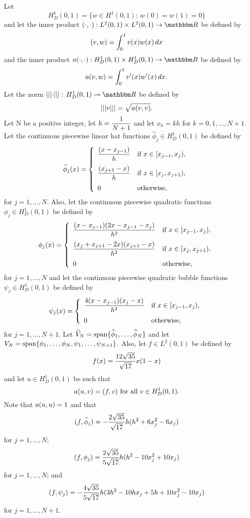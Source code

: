 Let
\[
H^1_D(0,1)=\{w\in H^1(0,1):\,w(0)=w(1)=0\}
\]
and let the inner product $\ip{\cdot,\cdot}:L^2(0,1)\times L^2(0,1)\to\R$ be defined by
\[
(v,w)=\int_0^1v(x)w(x)\,dx
\]
and the inner product $a\ip{\cdot,\cdot}:H^1_D(0,1)\times H^1_D(0,1)\to\R$ be defined by
\[
a(v,w)=\int_0^1v'(x)w'(x)\,dx.
\]
Let the norm $\left|\left|\left|\cdot\right|\right|\right|:\,H^1_D(0,1)\to\R$ be defined by
\[
\left|\left|\left|v\right|\right|\right|=\sqrt{a(v,v)}.
\]
Let N be a positive integer, let $\displaystyle{h={1 \over N+1}}$ and let $x_k=kh$ for $k=0,1,\ldots,N+1$. Let the continuous piecewise linear hat functions $\widehat{\phi}_j\in H^1_D(0,1)$ be defined by
\[
\widehat{\phi}_j(x) = \left\{\begin{array}{ll}
\displaystyle{{(x-x_{j-1}) \over h}} & \displaystyle{\mbox{if }x\in[x_{j-1},x_j)},
\\[10pt]
\displaystyle{{(x_{j+1}-x) \over h}} & \displaystyle{\mbox{if }x\in[x_j,x_{j+1})},
\\[10pt]
0 & \mbox{otherwise},
\end{array}\right.
\]
for $j=1,\ldots,N$. Also, let the continuous piecewise quadratic functions $\phi_j\in H^1_D(0,1)$ be defined by
\[
\phi_j(x)=\left\{\begin{array}{ll}
\displaystyle{{(x-x_{j-1})(2x-x_{j-1}-x_j) \over h^2}} & \displaystyle{\mbox{if }x\in[x_{j-1},x_j)},
\\[10pt]
\displaystyle{{(x_j+x_{j+1}-2x)(x_{j+1}-x) \over h^2}} & \displaystyle{\mbox{if }x\in[x_j,x_{j+1})},
\\[10pt]
0 & \mbox{otherwise},
\end{array}\right.
\]
for $j=1,\ldots,N$ and let the continuous piecewise quadratic bubble functions $\psi_j\in H^1_D(0,1)$ be defined by
\[
\psi_j(x)=\left\{\begin{array}{ll}
\displaystyle{{4(x-x_{j-1})(x_j-x) \over h^2}} & \displaystyle{\mbox{if }x\in[x_{j-1},x_j)},
\\[10pt]
0 & \mbox{otherwise},
\end{array}\right.
\]
for $j=1,\ldots,N+1$. Let $\widehat{V}_N={\rm span}\{\widehat{\phi}_1,\ldots,\widehat{\phi}_N\}$ and let $V_N={\rm span}\{\phi_1,\ldots,\phi_N,\psi_1,\ldots,\psi_{N+1}\}$. Also, let $f\in L^2(0,1)$ be defined by
\[
f(x)={12\sqrt{35} \over \sqrt{17}}x(1-x)
\]
and let $u\in H^1_D(0,1)$ be such that
\[
a(u,v)=(f,v)\mbox{ for all }v\in H^1_D(0,1).
\]
Note that $a(u,u)=1$ and that
\[
(f,\widehat{\phi}_j)=-{2\sqrt{35} \over \sqrt{17}}h(h^2+6x_j^2 - 6x_j)
\]
for $j=1,\ldots,N$;
\[
(f,\phi_j)={2\sqrt{35} \over 5\sqrt{17}}h(h^2-10x_j^2+10x_j)
\]
for $j=1,\ldots,N$; and
\[
(f,\psi_j)=-{4\sqrt{35} \over 5\sqrt{17}}h(3h^2-10hx_j+5h+10x_j^2-10x_j)
\]
for $j=1,\ldots,N+1$.

